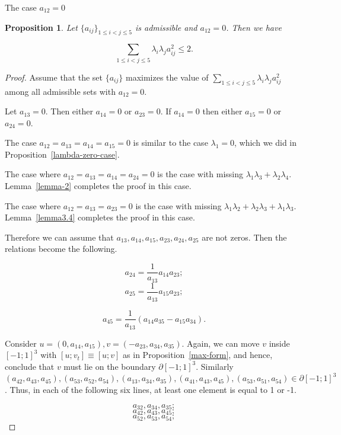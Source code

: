 \documentclass[12pt]{article}
\newtheorem{proposition}{Proposition}[section]
\begin{document}
\begin{section}{The case \texorpdfstring{$a_{12} = 0$}{Lg}}
    \begin{proposition}
        \label{zero-case}
        Let  $\{a_{ij}\}_{1\leq i<j\leq 5}$ is admissible and $a_{12}=0$. Then we have
    
        $$
             \sum_{1\leq i<j\leq 5}\lambda_{i}\lambda_{j}a_{ij}^2 \leq 2.
        $$
    \end{proposition}
    
    \begin{proof}
        Assume that the set $\{a_{ij}\}$ maximizes the value of $\sum_{1\leq i<j\leq 5}\lambda_{i}\lambda_{j}a_{ij}^2$ among all admissible sets with $a_{12}=0.$ 
    
        Let $a_{13}=0$. Then either $a_{14}=0$ or $a_{23}=0$. If $a_{14}=0$ then either $a_{15}=0$ or $a_{24}=0$. 

        The case $a_{12}=a_{13}=a_{14}=a_{15}=0$ is similar to the case $\lambda_{1} =0$, which we did in Proposition~\ref{lambda-zero-case}. 
        
        The case where $a_{12}=a_{13}=a_{14}=a_{24}=0$ is the case with missing $\lambda_{1}\lambda_{3} + \lambda_{2}\lambda_{4}$. Lemma~\ref{lemma-2} completes the proof in this case. 

        The case where $a_{12}=a_{13}=a_{23}=0$ is the case with missing $\lambda_{1}\lambda_{2} + \lambda_{2}\lambda_{3} + \lambda_{1}\lambda_{3}$. Lemma~\ref{lemma3.4} completes the proof in this case.

        Therefore we can assume that $a_{13},a_{14},a_{15},a_{23},a_{24},a_{25}$ are not zeros. Then the relations become the following.

        $$
            a_{24} = \frac{1}{a_{13}}a_{14}a_{23}; 
        $$
        $$
            a_{25} = \frac{1}{a_{13}}a_{15}a_{23};
        $$

        $$
            a_{45} = \frac{1}{a_{13}}(a_{14}a_{35} - a_{15}a_{34}).
        $$

        Consider $u=(0, a_{14},a_{15}), v=(-a_{23}, a_{34},a_{35})$.  Again, we can move $v$ inside $[-1;1]^3$ with $[u;v_{t}] \equiv [u;v]$ as in Proposition~\ref{max-form}, and hence,  conclude that $v$ must lie on the boundary $\partial [-1;1]^3.$ Similarly $(a_{42},a_{43},a_{45}), (a_{53},a_{52},a_{54}),(a_{13}, a_{34},a_{35}),(a_{41},a_{43},a_{45}),(a_{53},a_{51},a_{54}) \in \partial [-1;1]^{3}$. Thus, in each of the following six lines, at least one element is equal to 1 or -1.

        $$
            a_{32},a_{34},a_{35};
        $$
        $$
            a_{42},a_{43},a_{45};
        $$
        $$
            a_{52},a_{53},a_{54};
        $$


\end{proof}
\end{section}
\end{document}
